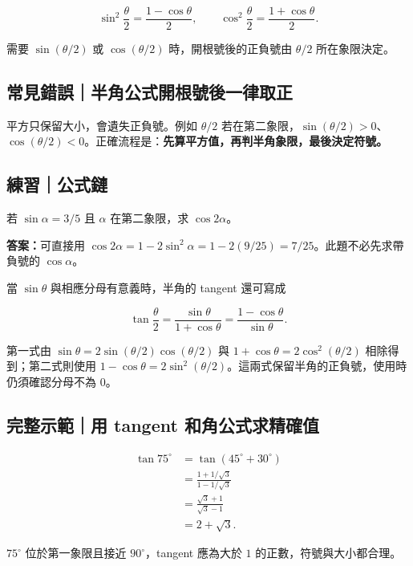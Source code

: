 \documentclass[11pt,a4paper]{article}
\begin{document}
\[
\boxed{\sin^2\frac\theta2=\frac{1-\cos\theta}{2}},
\qquad
\boxed{\cos^2\frac\theta2=\frac{1+\cos\theta}{2}}.
\]

需要 \(\sin(\theta/2)\) 或 \(\cos(\theta/2)\) 時，開根號後的正負號由 \(\theta/2\) 所在象限決定。

\subsection{常見錯誤｜半角公式開根號後一律取正}\label{ux5e38ux898bux932fux8aa4ux534aux89d2ux516cux5f0fux958bux6839ux865fux5f8cux4e00ux5f8bux53d6ux6b63}

平方只保留大小，會遺失正負號。例如 \(\theta/2\) 若在第二象限，\(\sin(\theta/2)>0\)、\(\cos(\theta/2)<0\)。正確流程是：\textbf{先算平方值，再判半角象限，最後決定符號。}

\begin{HandoutSelfCheck}

\subsection{練習｜公式鏈}\label{ux7df4ux7fd2ux516cux5f0fux93c8}

若 \(\sin\alpha=3/5\) 且 \(\alpha\) 在第二象限，求 \(\cos2\alpha\)。

\textbf{答案：}可直接用 \(\cos2\alpha=1-2\sin^2\alpha=1-2(9/25)=7/25\)。此題不必先求帶負號的 \(\cos\alpha\)。

\end{HandoutSelfCheck}

當 \(\sin\theta\) 與相應分母有意義時，半角的 tangent 還可寫成

\[
\boxed{
\tan\frac\theta2
=\frac{\sin\theta}{1+\cos\theta}
=\frac{1-\cos\theta}{\sin\theta}
}.
\]

第一式由 \(\sin\theta=2\sin(\theta/2)\cos(\theta/2)\) 與 \(1+\cos\theta=2\cos^2(\theta/2)\) 相除得到；第二式則使用 \(1-\cos\theta=2\sin^2(\theta/2)\)。這兩式保留半角的正負號，使用時仍須確認分母不為 \(0\)。

\begin{HandoutWorkedExample}

\subsection{完整示範｜用 tangent 和角公式求精確值}\label{ux5b8cux6574ux793aux7bc4ux7528-tangent-ux548cux89d2ux516cux5f0fux6c42ux7cbeux78baux503c}

\[
\begin{aligned}
\tan75^\circ
&=\tan(45^\circ+30^\circ)\\
&=\frac{1+1/\sqrt3}{1-1/\sqrt3}\\
&=\frac{\sqrt3+1}{\sqrt3-1}\\
&=\boxed{2+\sqrt3}.
\end{aligned}
\]

\(75^\circ\) 位於第一象限且接近 \(90^\circ\)，tangent 應為大於 \(1\) 的正數，符號與大小都合理。

\end{HandoutWorkedExample}
\end{document}
